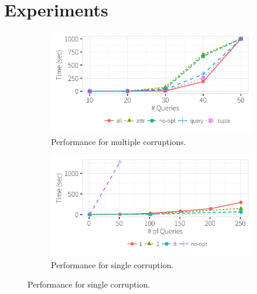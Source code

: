 
%
%
%
%
%
\section{Experiments}
\label{sec:experiments}


  \begin{figure}[h]
  \centering
    \vspace*{-.2in}
    \begin{subfigure}[t]{.3\textwidth}
    \includegraphics[width = .99\columnwidth]{figures/multi_time}
    \vspace*{-.3in}
    \caption{Performance for multiple corruptions.}
    \label{f:multi_time} 
    \end{subfigure}
    \begin{subfigure}[t]{.3\textwidth}
    \includegraphics[width = .99\columnwidth]{figures/incrementalcompare_time}
    \vspace*{-.3in}
    \caption{Performance for single corruption.}

\end{subfigure}
\end{figure}
